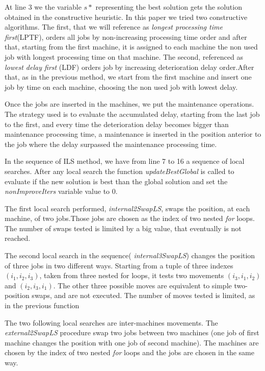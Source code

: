 \documentclass[a4paper,11pt]{article}
\begin{document}
At line 3 we the variable $s*$ representing the best solution gets the solution obtained in the constructive heuristic. In this paper we tried two constructive algorithms. The first, that we will reference as \emph{ longest processing time first}(LPTF), orders all jobs by non-increasing processing time order and after that, starting from the first machine, it is assigned to each machine the non used job with longest processing time on that machine. The second, referenced as \emph{lowest delay first} (LDF) orders job by increasing deterioration delay order.After that, as in the previous method, we start from the first machine and insert one job by time on each machine, choosing the non used job with lowest delay. 

Once the jobs are inserted in the machines, we put the maintenance operations. The strategy used is to evaluate the accumulated delay, starting from the last job to the first, and every time the deterioration delay becomes bigger than maintenance processing time, a maintenance is inserted in the position anterior to the job where the delay surpassed the maintenance processing time. 

In the sequence of ILS method, we have from line 7 to 16 a sequence of local searches. After any local search the function \emph{updateBestGlobal} is called to evaluate if the new solution is best than the global solution and set the \emph{nonImproveIters} variable value to 0.

The first local search performed, \emph{internal2SwapLS}, swaps the position, at each machine, of two jobs.Those jobs are chosen as the index of two nested \emph{for} loops. The number of swaps tested is limited by a big value, that eventually is not reached. 

The second local search in the sequence( \emph{internal3SwapLS}) changes the position of three jobs in two different ways. Starting from a tuple of three indexes $(i_1, i_2, i_3)$, taken from three nested for loops, it tests two movements $(i_3, i_1, i_2)$ and $(i_2, i_3,i_1)$. The other three possible moves are equivalent to simple two-position swaps, and are not executed. The number of moves tested is limited, as in the previous function

The two following local searches are inter-machines movements. The \emph{external2SwapLS} procedure swap two jobs between two machines (one job of first machine changes the position with one job of second machine). The machines are chosen by the index of two nested \emph{for} loops and the jobs are chosen in the same way. 
\end{document}
